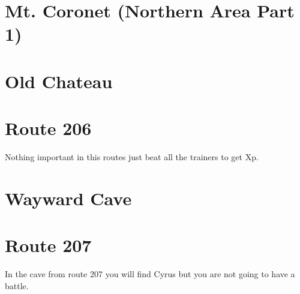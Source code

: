 \documentclass[11pt]{article}
\begin{document}


\section{Mt. Coronet (Northern Area Part 1)}\label{sec:Mt._Coronet_North}
% 

\section{Old Chateau}\label{sec:Old_Chateau}




\section{Route 206}\label{sec:Route_206}
Nothing important in this routes just beat all the trainers to get Xp.

\section{Wayward Cave}\label{sec:Wayward_Cave}



\section{Route 207}\label{sec:Route_207}
In the cave from route 207 you will find Cyrus but you are not going to have a battle.



\end{document}
